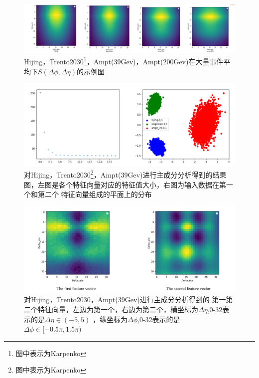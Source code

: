 \documentclass[aps,pre,12pt,preprint,onecolumn,showpacs,showkeys]{revtex4-1}
\begin{document}
\begin{figure}[t]
\centering
\includegraphics[width=140mm]{pcasample}
\caption{\label{fig:pcasample}%
Hijing，Trento2030\footnote{图中表示为Karpenko}，Ampt(39Gev)，Ampt(200Gev)在大量事件平均下$S(\Delta\phi,\Delta\eta)$的示例图}
\end{figure}
\begin{figure}[t]
\centering
\includegraphics[width=140mm]{pcaresults}
\caption{\label{fig:pcaresults}%
对Hijing，Trento2030\footnote{图中表示为Karpenko}，Ampt(39Gev)进行主成分分析得到的结果图，左图是各个特征向量对应的特征值大小，右图为输入数据在第一个和第二个
特征向量组成的平面上的分布}
\end{figure}
\begin{figure}[t]
\centering
\includegraphics[width=140mm]{tzxl}
\caption{\label{fig:tzxl}%
对Hijing，Trento2030，Ampt(39Gev)进行主成分分析得到的
第一第二个特征向量，左边为第一个，右边为第二个，横坐标为$\Delta\eta$,0-32表示的是$\Delta\eta\in(-5,5)$
，纵坐标为$\Delta\phi$,0-32表示的是$\Delta\phi\in[-0.5\pi,1.5\pi)$}
\end{figure}
\end{document}
